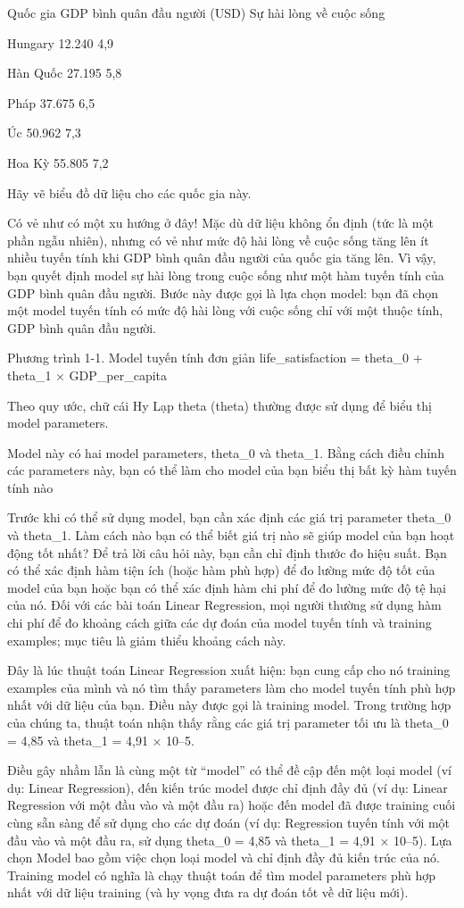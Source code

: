 Quốc gia GDP bình quân đầu người (USD) Sự hài lòng về cuộc sống

Hungary 12.240 4,9

Hàn Quốc 27.195 5,8

Pháp 37.675 6,5

Úc 50.962 7,3

Hoa Kỳ 55.805 7,2

Hãy vẽ biểu đồ dữ liệu cho các quốc gia này.

Có vẻ như có một xu hướng ở đây! Mặc dù dữ liệu không ổn định (tức là một phần ngẫu nhiên), nhưng có vẻ như mức độ hài lòng về cuộc sống tăng lên ít nhiều tuyến tính khi GDP bình quân đầu người của quốc gia tăng lên. Vì vậy, bạn quyết định model sự hài lòng trong cuộc sống như một hàm tuyến tính của GDP bình quân đầu người. Bước này được gọi là lựa chọn model: bạn đã chọn một model tuyến tính có mức độ hài lòng với cuộc sống chỉ với một thuộc tính, GDP bình quân đầu người.

Phương trình 1-1. Model tuyến tính đơn giản life\_satisfaction = theta\_0 + theta\_1 × GDP\_per\_capita

Theo quy ước, chữ cái Hy Lạp theta (theta) thường được sử dụng để biểu thị model parameters.

Model này có hai model parameters, theta\_0 và theta\_1. Bằng cách điều chỉnh các parameters này, bạn có thể làm cho model của bạn biểu thị bất kỳ hàm tuyến tính nào

Trước khi có thể sử dụng model, bạn cần xác định các giá trị parameter theta\_0 và theta\_1. Làm cách nào bạn có thể biết giá trị nào sẽ giúp model của bạn hoạt động tốt nhất? Để trả lời câu hỏi này, bạn cần chỉ định thước đo hiệu suất. Bạn có thể xác định hàm tiện ích (hoặc hàm phù hợp) để đo lường mức độ tốt của model của bạn hoặc bạn có thể xác định hàm chi phí để đo lường mức độ tệ hại của nó. Đối với các bài toán Linear Regression, mọi người thường sử dụng hàm chi phí để đo khoảng cách giữa các dự đoán của model tuyến tính và training examples; mục tiêu là giảm thiểu khoảng cách này.

Đây là lúc thuật toán Linear Regression xuất hiện: bạn cung cấp cho nó training examples của mình và nó tìm thấy parameters làm cho model tuyến tính phù hợp nhất với dữ liệu của bạn. Điều này được gọi là training model. Trong trường hợp của chúng ta, thuật toán nhận thấy rằng các giá trị parameter tối ưu là theta\_0 = 4,85 và theta\_1 = 4,91 × 10–5.

Điều gây nhầm lẫn là cùng một từ “model” có thể đề cập đến một loại model (ví dụ: Linear Regression), đến kiến trúc model được chỉ định đầy đủ (ví dụ: Linear Regression với một đầu vào và một đầu ra) hoặc đến model đã được training cuối cùng sẵn sàng để sử dụng cho các dự đoán (ví dụ: Regression tuyến tính với một đầu vào và một đầu ra, sử dụng theta\_0 = 4,85 và theta\_1 = 4,91 × 10–5). Lựa chọn Model bao gồm việc chọn loại model và chỉ định đầy đủ kiến ​​trúc của nó. Training model có nghĩa là chạy thuật toán để tìm model parameters phù hợp nhất với dữ liệu training (và hy vọng đưa ra dự đoán tốt về dữ liệu mới).

